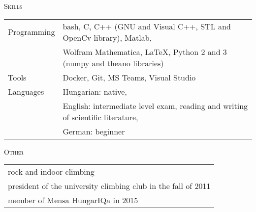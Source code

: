 \documentclass[12pt]{article}
\begin{document}
 \textsc{Skills}

        \begin{tabular}{>{\raggedright\arraybackslash}p{3cm}l}
	       Programming &  bash, C, C++ (GNU and Visual C++, STL and OpenCv library), Matlab, \\
             & Wolfram Mathematica, \LaTeX, Python 2 and 3 (numpy and theano libraries)\\
           Tools & Docker, Git, MS Teams, Visual Studio \\
           Languages & Hungarian: native, \\
                    & English: intermediate level exam, reading and writing of scientific literature, \\
                    & German: beginner
        \end{tabular}
 
 \textsc{Other}
 
 \begin{tabular}{l}
        rock and indoor climbing\\
        president of the university climbing club in the fall of 2011\\
        member of Mensa HungarIQa in 2015
    \end{tabular}
\end{document}
